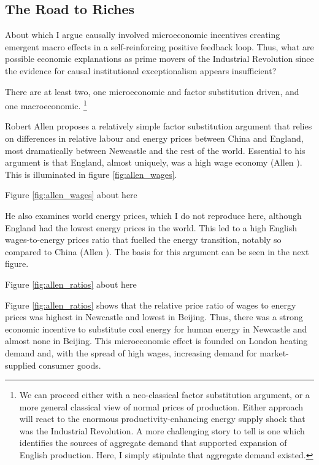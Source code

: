 \documentclass[12pt]{article}
\numberwithin{equation}{section}
\begin{document}
		\subsection*{The Road to Riches}
		
		About which I argue causally involved microeconomic incentives creating emergent macro effects in a self-reinforcing positive feedback loop. Thus, what are possible economic explanations as prime movers of the Industrial Revolution since the evidence for causal institutional exceptionalism appears insufficient?
		
		There are at least two, one microeconomic and factor substitution driven, and one macroeconomic. \footnote{We can proceed either with a neo-classical factor substitution argument, or a more general classical view of normal prices of production. Either approach will react to the enormous productivity-enhancing energy supply shock that was the Industrial Revolution. A more challenging story to tell is one which identifies the sources of aggregate demand that supported expansion of English production. Here, I simply stipulate that aggregate demand existed.}
		
		Robert Allen proposes a relatively simple factor substitution argument that relies on differences in relative labour and energy prices between China and England, most dramatically between Newcastle and the rest of the world. Essential to his argument is that England, almost uniquely, was a high wage economy (Allen \citeyear[p.~34]{allen_british_2009}). This is illuminated in figure \ref{fig:allen_wages}. 
		
\begin{center}
Figure \ref{fig:allen_wages} about here
\end{center}		
		
		He also examines world energy prices, which I do not reproduce here, although England had the lowest energy prices in the world. This led to a high English wages-to-energy prices ratio that fuelled the energy transition, notably so compared to China (Allen \citeyear[p.~140]{allen_british_2009}). The basis for this argument can be seen in the next figure. 

\begin{center}
Figure \ref{fig:allen_ratios} about here
\end{center}			
		
		
		Figure \ref{fig:allen_ratios} shows that the relative price ratio of wages to energy prices was highest in Newcastle and lowest in Beijing. Thus, there was a strong economic incentive to substitute coal energy for human energy in Newcastle and almost none in Beijing. This microeconomic effect is founded on London heating demand and, with the spread of high wages, increasing demand for market-supplied consumer goods.
		
\end{document}
